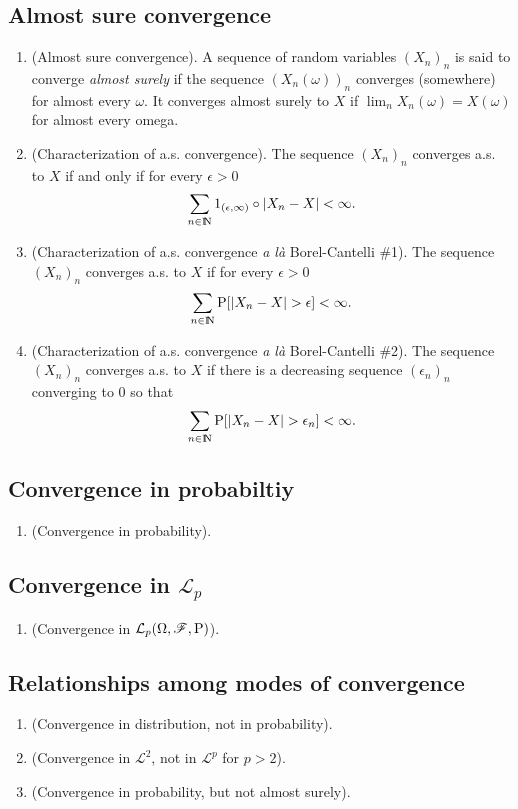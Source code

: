 \documentclass[a4paper,10pt]{article}
\begin{document}
\subsection{Almost sure convergence}
\begin{enumerate}
 \item (Almost sure convergence). A sequence of random variables $(X_n)_n$ is said to converge \textit{almost surely}
       if the sequence $(X_n(\omega))_n$ converges (somewhere) for almost every $\omega$. It converges almost surely to $X$
       if $\lim_n X_n(\omega) = X(\omega)$ for almost every omega.
       
 \item (Characterization of a.s. convergence). The sequence $(X_n)_n$ converges a.s. to $X$ if and only if for every $\epsilon>0$
       \[
        \sum_{n\in\N}1_{(\epsilon,\infty)}\circ|X_n - X| < \infty.
       \]

 \item (Characterization of a.s. convergence \textit{a l\`a} Borel-Cantelli \#1).
       The sequence $(X_n)_n$ converges a.s. to $X$ if for every $\epsilon>0$
       \[
        \sum_{n\in\N}\prob[|X_n-X|>\epsilon] < \infty.
       \]

 \item (Characterization of a.s. convergence \textit{a l\`a} Borel-Cantelli \#2).
       The sequence $(X_n)_n$ converges a.s. to $X$ if there is a decreasing sequence $(\epsilon_n)_n$
       converging to $0$ so that 
       \[
        \sum_{n\in\N}\prob[|X_n-X|>\epsilon_n] < \infty.
       \]
\end{enumerate}

\subsection{Convergence in probabiltiy}       
\begin{enumerate}
 \item (Convergence in probability).
\end{enumerate} 
 
\subsection{Convergence in $\mathcal{L}_p$}
\begin{enumerate}
\item (Convergence in $\mathcal{L}_p(\Omega,\mathscr{F},\mathrm{P})$).
\end{enumerate}

\subsection{Relationships among modes of convergence}
\begin{enumerate}
 \item (Convergence in distribution, not in probability).
 \item (Convergence in $\mathcal{L}^2$, not in $\mathcal{L}^p$ for $p>2$).
 \item (Convergence in probability, but not almost surely).
\end{enumerate}
\end{document}
